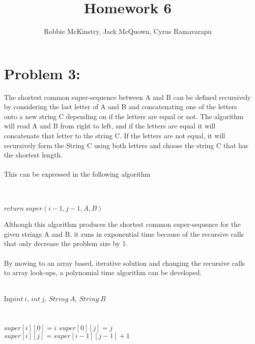 \documentclass[12pt]{article}
\begin{document}
\title{Homework 6}
\author{Robbie McKinstry, Jack McQuown, Cyrus Ramavarapu}
\renewcommand{\today}{13 September 2016}
\renewcommand{\baselinestretch}{1.5}

\maketitle

\section*{Problem 3: }
The shortest common super-sequence between A and B can be defined recursively by considering
the last letter of A and B and concatenating one of the letters onto a new string C depending on if the letters are equal or not.
The algorithm will read A and B from right to left, and if the letters are equal it will concatenate that letter to the string C. If the letters are not equal, it will recursively form the String C using both letters and choose the string C that has the shortest length.\\\\
This can be expressed in the following algorithm\\\\
\begin{algorithm}[H]
\\
{$return\ super(i - 1, j - 1, A, B)$}
\end{algorithm}
Although this algorithm produces the shortest common super-sequence for the given strings A and B, it runs in exponential time because of the recursive calls that only decrease the problem size by 1.\\\\
By moving to an array based, iterative solution and changing the recursive calls to array look-ups, a polynomial time algorithm can be developed.\\\\

\begin{algorithm}[H]
{Inp}{$int\ i$, $int\ j$, $String\ A$, $String\ B$}\\
\Init\\
\\
{$super[i][0] = i$}
{$super[0][j] = j$}
\Calc\\
{
{
{$super[i][j] = super[i - 1][j - 1] + 1$}
}
}
\end{algorithm}
\end{document}
